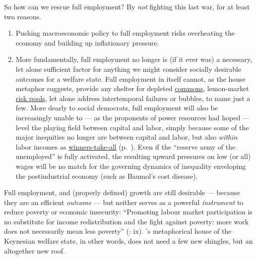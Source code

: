 \begin{description}
	So how can we rescue full employment? By \emph{not} fighting this last war, for at least two reasons.
	
	\begin{enumerate}
		\item Pushing macroeconomic policy to full employment risks overheating the economy and building up inflationary pressure.
		\item More fundamentally, full employment no longer is (if it ever was) a necessary, let alone sufficient factor for anything we might consider socially desirable outcomes for a welfare state. Full employment in itself cannot, as the house metaphor suggests, provide any shelter for depleted \hyperref[sec:common-good]{commons}, lemon-market \hyperref[sec:adverse-selection]{risk pools}, let alone address intertemporal failures or bubbles, to name just a few. More dearly to social democrats, full employment will also be increasingly unable to --- as the proponents of power resources had hoped --- level the playing field between capital and labor, simply because some of the major inequities no longer are between capital and labor, but also \emph{within} labor incomes as \hyperref[sec:winner-take-all]{winners-take-all} (p.~\pageref{sec:winner-take-all}). Even if the ``reserve army of the unemployed'' is fully activated, the resulting upward pressures on low (or all) wages will be no match for the governing dynamics of inequality enveloping the postindustrial economy (such as Baumol's cost disease). 	
	\end{enumerate}
	
	Full employment, and (properly defined) growth are still desirable --- because they are an efficient \emph{outcome} --- but neither serves as a powerful \emph{instrument} to reduce poverty or economic insecurity: ``Promoting labour market participation is no substitute for income redistribution and the fight against poverty: more work does not necessarily mean less poverty'' (\citealt{Esping-Andersen2002}: ix). \citeauthor{Offe2003}'s metaphorical house of the Keynesian welfare state, in other words, does not need a few new shingles, but an altogether new roof. 
	

\end{description}

